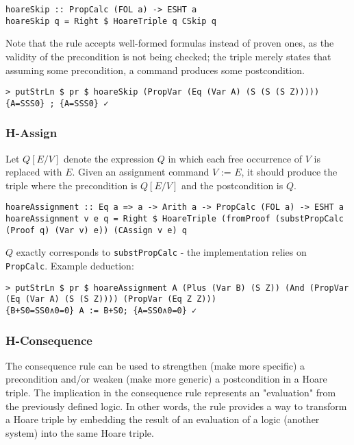 \documentclass{article}
\begin{document}
\begin{lstlisting}
hoareSkip :: PropCalc (FOL a) -> ESHT a
hoareSkip q = Right $ HoareTriple q CSkip q
\end{lstlisting}

Note that the rule accepts well-formed formulas instead of proven ones, as the validity of the precondition is not being checked; the triple merely states that assuming some precondition, a command produces some postcondition.

\begin{lstlisting}
> putStrLn $ pr $ hoareSkip (PropVar (Eq (Var A) (S (S (S Z)))))
{A=SSS0} ; {A=SSS0} ✓
\end{lstlisting}

\subsubsection{H-Assign}

Let $Q[E/V]$ denote the expression $Q$ in which each free occurrence of $V$ is replaced with $E$. Given an assignment command $V \texttt{ := } E$, it should produce the triple where the precondition is $Q[E/V]$ and the postcondition is $Q$.

\begin{lstlisting}
hoareAssignment :: Eq a => a -> Arith a -> PropCalc (FOL a) -> ESHT a
hoareAssignment v e q = Right $ HoareTriple (fromProof (substPropCalc (Proof q) (Var v) e)) (CAssign v e) q
\end{lstlisting}

$Q$ exactly corresponds to \texttt{substPropCalc} - the implementation relies on \texttt{PropCalc}. Example deduction:

\begin{lstlisting}
> putStrLn $ pr $ hoareAssignment A (Plus (Var B) (S Z)) (And (PropVar (Eq (Var A) (S (S Z)))) (PropVar (Eq Z Z)))
{B+S0=SS0∧0=0} A := B+S0; {A=SS0∧0=0} ✓
\end{lstlisting}

\subsubsection{H-Consequence}

The consequence rule can be used to strengthen (make more specific) a precondition and/or weaken (make more generic) a postcondition in a Hoare triple. The implication in the consequence rule represents an "evaluation" from the previously defined logic. In other words, the rule provides a way to transform a Hoare triple by embedding the result of an evaluation of a logic (another system) into the same Hoare triple.
\end{document}
